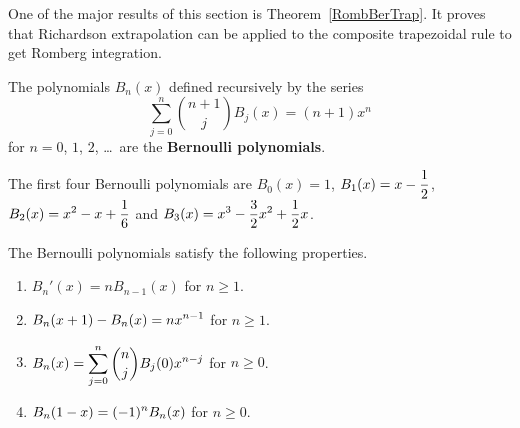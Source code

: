 One of the major results of this section is Theorem~\ref{RombBerTrap}.  It
proves that Richardson extrapolation can be applied to the composite
trapezoidal rule to get Romberg integration.

\begin{defn}
The polynomials $B_n(x)$ defined recursively by the series
\begin{equation} \label{BePo}
\sum_{j=0}^n \binom{n+1}{j} B_j(x) = (n+1)x^n
\end{equation}
for $n=0$, $1$, $2$, \ldots\ are the
{\bfseries Bernoulli polynomials}.
\end{defn}

\begin{rmk}
The first four Bernoulli polynomials are $B_0(x) = 1$,
$\displaystyle B_1(x) = x - \frac{1}{2}$,
$\displaystyle B_2(x) = x^2 - x + \frac{1}{6}$ and
$\displaystyle B_3(x) = x^3 - \frac{3}{2}x^2 + \frac{1}{2}x$.
\end{rmk}

\begin{prop}
The Bernoulli polynomials satisfy the following properties.
\begin{enumerate}
\item $B_n'(x) = n B_{n-1}(x)$ for $n\geq 1$.
\item $\displaystyle B_n(x+1) - B_n(x) = n x^{n-1}$ for $n\geq 1$.
\item $\displaystyle B_n(x) = \sum_{j=0}^n \binom{n}{j} B_j(0) x^{n-j}$
for $n \geq 0$.
\item $\displaystyle B_n(1-x) = (-1)^n B_n(x)$ for $n \geq 0$.
\end{enumerate}
\label{BePoProp}
\end{prop}

